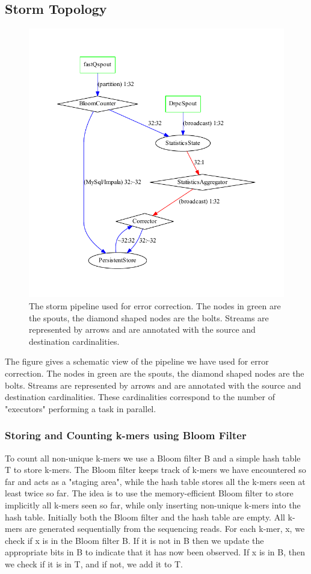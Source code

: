 \documentclass[11pt]{article}
\begin{document}
\subsection{Storm Topology}
\begin{figure}[ht!]
\centering
\includegraphics[width=120mm]{topology.pdf}
\caption{\tiny{The storm pipeline used for error correction. The nodes in green are the spouts, the diamond shaped nodes are the bolts. Streams are represented by arrows and are annotated with the source and destination cardinalities.}}
\label{overflow}
\end{figure}
The figure gives a schematic view of the pipeline we have used for error correction. The nodes in green are the spouts, the diamond shaped nodes are the bolts. Streams are represented by arrows and are annotated with the source and destination cardinalities. These cardinalities correspond to the number of "executors" performing a task in parallel. 

\subsubsection{Storing and Counting k-mers using Bloom Filter}
To count all non-unique k-mers we use a Bloom filter B and a simple hash table T to store k-mers. The Bloom filter keeps track of k-mers we have encountered so far and acts as a "staging area", while the hash table stores all the k-mers seen at least twice so far. The idea is to use the memory-efficient Bloom filter to store implicitly all k-mers seen so far, while only inserting non-unique k-mers into the hash table. Initially both the Bloom filter and the hash table are empty. All k-mers are generated sequentially from the sequencing reads. For each k-mer, x, we check if x is in the Bloom filter B. If it is not in B then we update the appropriate bits in B to indicate that it has now been observed. If x is in B, then we check if it is in T, and if not, we add it to T.
\end{document}
